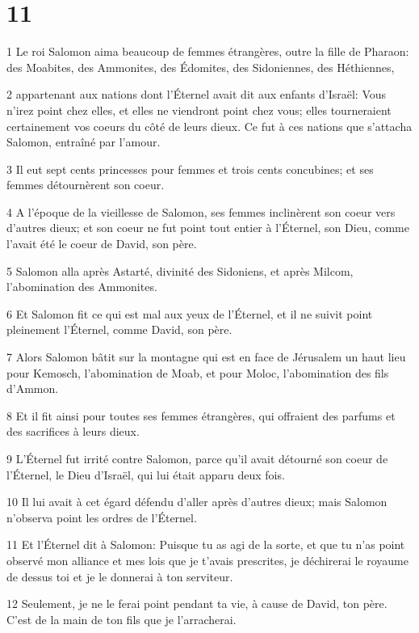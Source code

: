 \chapter{11}

\par 1 Le roi Salomon aima beaucoup de femmes étrangères, outre la fille de Pharaon: des Moabites, des Ammonites, des Édomites, des Sidoniennes, des Héthiennes,
\par 2 appartenant aux nations dont l'Éternel avait dit aux enfants d'Israël: Vous n'irez point chez elles, et elles ne viendront point chez vous; elles tourneraient certainement vos coeurs du côté de leurs dieux. Ce fut à ces nations que s'attacha Salomon, entraîné par l'amour.
\par 3 Il eut sept cents princesses pour femmes et trois cents concubines; et ses femmes détournèrent son coeur.
\par 4 A l'époque de la vieillesse de Salomon, ses femmes inclinèrent son coeur vers d'autres dieux; et son coeur ne fut point tout entier à l'Éternel, son Dieu, comme l'avait été le coeur de David, son père.
\par 5 Salomon alla après Astarté, divinité des Sidoniens, et après Milcom, l'abomination des Ammonites.
\par 6 Et Salomon fit ce qui est mal aux yeux de l'Éternel, et il ne suivit point pleinement l'Éternel, comme David, son père.
\par 7 Alors Salomon bâtit sur la montagne qui est en face de Jérusalem un haut lieu pour Kemosch, l'abomination de Moab, et pour Moloc, l'abomination des fils d'Ammon.
\par 8 Et il fit ainsi pour toutes ses femmes étrangères, qui offraient des parfums et des sacrifices à leurs dieux.
\par 9 L'Éternel fut irrité contre Salomon, parce qu'il avait détourné son coeur de l'Éternel, le Dieu d'Israël, qui lui était apparu deux fois.
\par 10 Il lui avait à cet égard défendu d'aller après d'autres dieux; mais Salomon n'observa point les ordres de l'Éternel.
\par 11 Et l'Éternel dit à Salomon: Puisque tu as agi de la sorte, et que tu n'as point observé mon alliance et mes lois que je t'avais prescrites, je déchirerai le royaume de dessus toi et je le donnerai à ton serviteur.
\par 12 Seulement, je ne le ferai point pendant ta vie, à cause de David, ton père. C'est de la main de ton fils que je l'arracherai.

